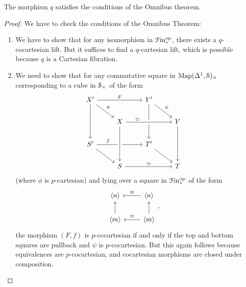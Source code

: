 \documentclass[main.tex]{subfiles}
\begin{document}
\begin{lemma}
  The morphism $q$ satisfies the conditions of the Omnibus theorem.
\end{lemma}
\begin{proof}
  We have to check the conditions of the Omnibus Theorem:
  \begin{enumerate}
    \item We have to show that for any isomorphism in $\Finp\op$, there exists a $q$-cocartesian lift. But it suffices to find a $q$-cartesian lift, which is possible because $q$ is a Cartesian fibration.

    \item We need to show that for any commutative square in $\Map(\Delta^{1}, \S)_{\times}$ corresponding to a cube in $\S_{\times}$ of the form
      \begin{equation*}
        \begin{tikzcd}
          X'
          \arrow[rr, "F"]
          \arrow[dd]
          \arrow[dr, "\phi"]
          && Y'
          \arrow[dd]
          \arrow[dr, "\psi"]
          \\
          & X
          \arrow[rr, crossing over, near start, "\simeq"]
          && Y
          \arrow[dd]
          \\
          S'
          \arrow[dr]
          \arrow[rr, near start, "f"]
          && T'
          \arrow[dr]
          \\
          & S
          \arrow[from=uu, crossing over]
          \arrow[rr, "\simeq"]
          && T
        \end{tikzcd}
      \end{equation*}
      (where $\phi$ is $p$-cartesian) and lying over a square in $\Finp\op$ of the form
      \begin{equation*}
        \begin{tikzcd}
          \langle n \rangle
          & \langle n \rangle
          \arrow[l, swap, "\cong"]
          \\
          \langle m \rangle
          \arrow[u]
          & \langle m \rangle
          \arrow[l, swap, "\cong"]
          \arrow[u]
        \end{tikzcd},
      \end{equation*}
      the morphism $(F, f)$ is $p$-cocartesian if and only if the top and bottom squares are pullback and $\psi$ is $p$-cocartesian. But this again follows because equivalences are $p$-cocartesian, and cocartesian morphisms are closed under composition.
  \end{enumerate}
\end{proof}
\end{document}
